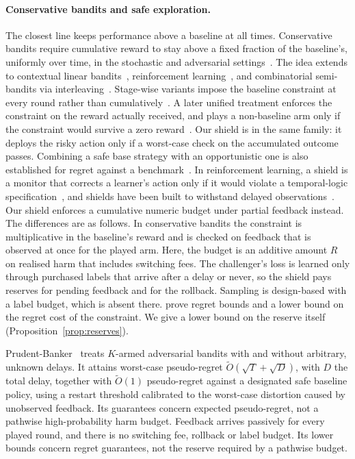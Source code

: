 \documentclass[10pt]{article}
\theoremstyle{plain}
\theoremstyle{definition}
\begin{document}
\paragraph{Conservative bandits and safe exploration.}
The closest line keeps performance above a baseline at all times. Conservative bandits require cumulative reward to stay above a fixed fraction of the baseline's, uniformly over time, in the stochastic and adversarial settings~\citep{wu2016conservative}. The idea extends to contextual linear bandits~\citep{kazerouni2017conservative}, reinforcement learning~\citep{garcelon2020conservative}, and combinatorial semi-bandits via interleaving~\citep{katariya2019conservative}. Stage-wise variants impose the baseline constraint at every round rather than cumulatively~\citep{moradipari2020stagewise}. A later unified treatment enforces the constraint on the reward actually received, and plays a non-baseline arm only if the constraint would survive a zero reward~\citep{du2020conservative}. Our shield is in the same family: it deploys the risky action only if a worst-case check on the accumulated outcome passes. Combining a safe base strategy with an opportunistic one is also established for regret against a benchmark~\citep{sani2014easy}. In reinforcement learning, a shield is a monitor that corrects a learner's action only if it would violate a temporal-logic specification~\citep{alshiekh2018shielding}, and shields have been built to withstand delayed observations~\citep{cano2023delayed}. Our shield enforces a cumulative numeric budget under partial feedback instead.
The differences are as follows. In conservative bandits the constraint is multiplicative in the baseline's reward and is checked on feedback that is observed at once for the played arm. Here, the budget is an additive amount $R$ on realised harm that includes switching fees. The challenger's loss is learned only through purchased labels that arrive after a delay or never, so the shield pays reserves for pending feedback and for the rollback. Sampling is design-based with a label budget, which is absent there. \citet{wu2016conservative} prove regret bounds and a lower bound on the regret cost of the constraint. We give a lower bound on the reserve itself (Proposition~\ref{prop:reserves}).

Prudent-Banker~\citep{hu2026prudent} treats $K$-armed adversarial bandits with and without arbitrary, unknown delays. It attains worst-case pseudo-regret $\tilde O(\sqrt T+\sqrt D)$, with $D$ the total delay, together with $\tilde O(1)$ pseudo-regret against a designated safe baseline policy, using a restart threshold calibrated to the worst-case distortion caused by unobserved feedback. Its guarantees concern expected pseudo-regret, not a pathwise high-probability harm budget. Feedback arrives passively for every played round, and there is no switching fee, rollback or label budget. Its lower bounds concern regret guarantees, not the reserve required by a pathwise budget.
\end{document}
